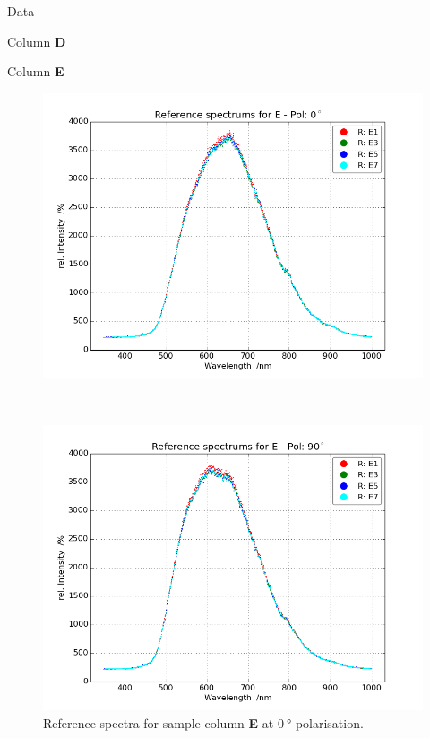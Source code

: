 \begin{appendix}
\begin{chapter}{Data}
\begin{section}{Column \textbf{D}}
    \end{section}
    
    
    
    \newpage
    \begin{section}{Column \textbf{E}}
      \label{Appendix:DataE}
      
      \begin{figure}[ht!]
        \centering
        \begin{minipage}{.92\textwidth}
          \centering
          \includegraphics[width=\textwidth]{Figures/Refspec_EPol0.png}
          \caption{Reference spectra for sample-column \textbf{E} at
              $\SI{0}{\degree}$ polarisation.}
          \label{fig:Refspec_EPol0}
        \end{minipage}\\
        \begin{minipage}{.92\textwidth}
          \centering
          \includegraphics[width=\textwidth]{Figures/Refspec_EPol90.png}

\end{minipage}
\end{figure}
\end{section}
\end{chapter}
\end{appendix}
